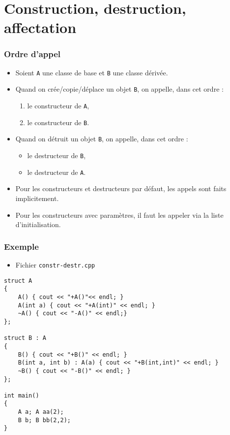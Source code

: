 \section{Construction, destruction, affectation}

\begin{frame}
\frametitle{Ordre d'appel}
\begin{itemize}[<+->]
\item Soient \texttt{A} une classe de base et \texttt{B} une classe dérivée.
\item Quand on crée/copie/déplace un objet \texttt{B}, on appelle, dans cet ordre :
	\begin{enumerate}
	\item le constructeur de \texttt{A},
	\item le constructeur de \texttt{B}.
	\end{enumerate}
\item Quand on détruit un objet \texttt{B}, on appelle, dans cet ordre :
	\begin{itemize}
	\item le destructeur de \texttt{B},
	\item le destructeur de \texttt{A}.	
	\end{itemize}
\item Pour les constructeurs et destructeurs par défaut, les appels sont faits implicitement.
\item Pour les constructeurs avec paramètres, il faut les appeler via la liste d'initialisation.
\end{itemize}
\end{frame}

\begin{frame}[containsverbatim]
\frametitle{Exemple}
\begin{itemize}
\item Fichier \texttt{constr-destr.cpp}
\end{itemize}
\begin{lstlisting}
struct A
{
	A() { cout << "+A()"<< endl; }
	A(int a) { cout << "+A(int)" << endl; }
	~A() { cout << "-A()" << endl;}		
};

struct B : A
{
	B() { cout << "+B()" << endl; }
	B(int a, int b) : A(a) { cout << "+B(int,int)" << endl; }			
	~B() { cout << "-B()" << endl; }
};

int main()
{
	A a; A aa(2);
	B b; B bb(2,2);
}
\end{lstlisting}
\end{frame}

